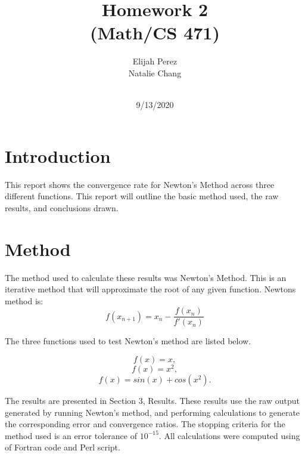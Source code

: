 \documentclass[12pt]{article}
\title{Homework 2 \protect\\ (Math/CS 471)}
\author{Elijah Perez \protect\\ Natalie Chang}
\date{\vfill\\ 9/13/2020}
\begin{document}
	\maketitle
	\pagebreak
	\section{Introduction}
     This report shows the convergence rate for Newton's Method across three different functions. This report will outline the basic method used, the raw results, and conclusions drawn.
     
    
     
	
	\section{Method}
	The method used to calculate these results was Newton's Method. This is an iterative method that will approximate the root of any given function. 
	Newtons method is:
	\begin{equation}
		f(x_{n+1}) = x_n - \frac{f(x_n)}{f'(x_n)} 
	\end{equation}
	
	The three functions used to test Newton's method are listed below.

	
	\begin{equation}
		f(x) = x, \label{eq:1} 
	\end{equation}
	\begin{equation}
		f(x) = x^2, \label{eq:2} 
	\end{equation}
	\begin{equation}
		f(x) = sin(x) + cos(x^2). \label{eq:3} 
	\end{equation}

	The results are presented in Section 3, Results. These results use the raw output generated by running Newton's method, and performing calculations to generate the corresponding error and convergence ratios. The stopping criteria for the method used is an error tolerance of $10^{-15}$. All calculations were computed using of Fortran code and Perl script.
	

	

	
\end{document}
